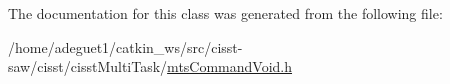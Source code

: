 The documentation for this class was generated from the following file\-:\begin{DoxyCompactItemize}
\item 
/home/adeguet1/catkin\-\_\-ws/src/cisst-\/saw/cisst/cisst\-Multi\-Task/\hyperlink{mts_command_void_8h}{mts\-Command\-Void.\-h}\end{DoxyCompactItemize}
